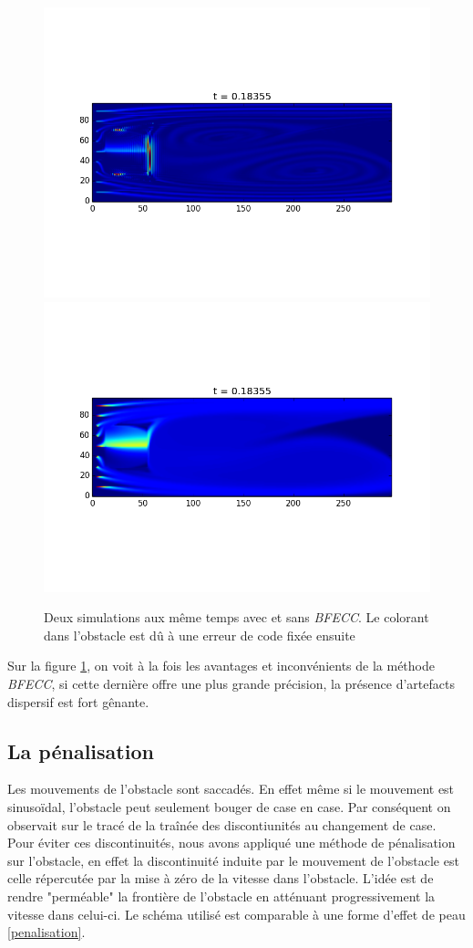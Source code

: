 		\begin{figure}[htbp]
		\begin{center}
			\includegraphics[width=0.8 \textwidth]{BFECC.png}
			\includegraphics[width=0.8 \textwidth]{NO-BFECC.png}
			\caption{Deux simulations aux même temps avec et sans \emph{BFECC}. Le colorant dans l'obstacle est dû à une erreur de code fixée ensuite}
			\label{Comparaison}
		\end{center}
		\end{figure}
		
		Sur la figure \ref{Comparaison}, on voit à la fois les avantages et inconvénients de la méthode \emph{BFECC}, si cette dernière offre une plus grande précision, la présence d'artefacts dispersif est fort gênante. 
	
	\subsection{La pénalisation}

		Les mouvements de l'obstacle sont saccadés. En effet même si le mouvement est sinusoïdal, l'obstacle peut seulement bouger de case en case. Par conséquent on observait sur le tracé de la traînée des discontiunités au changement de case. Pour éviter ces discontinuités, nous avons appliqué une méthode de pénalisation sur l'obstacle, en effet la discontinuité induite par le mouvement de l'obstacle est celle répercutée par la mise à zéro de la vitesse dans l'obstacle. L'idée est de rendre "perméable" la frontière de l'obstacle en atténuant progressivement la vitesse dans celui-ci. Le schéma utilisé est comparable à une forme d'effet de peau \eqref{penalisation}. 
		
